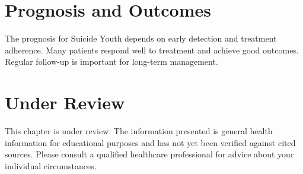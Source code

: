 \section*{Prognosis and Outcomes}
The prognosis for Suicide Youth depends on early detection and treatment adherence. Many patients respond well to treatment and achieve good outcomes. Regular follow-up is important for long-term management.
\section*{Under Review}
This chapter is under review. The information presented is general health information for educational purposes and has not yet been verified against cited sources. Please consult a qualified healthcare professional for advice about your individual circumstances.


\clearpage
